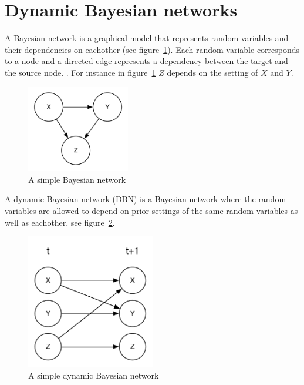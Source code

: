 \section{Dynamic Bayesian networks}
\label{sec:dbn}

A Bayesian network is a graphical model that represents random variables and
their dependencies on eachother (see figure~\ref{fig:bn}). Each random variable
corresponds to a node and a directed edge represents a dependency between the
target and the source node. \parencite{heckerman1998tutorial}. For instance in
figure~\ref{fig:bn} $Z$ depends on the setting of $X$ and $Y$. 

\begin{figure}[H]
\centering
\includegraphics[width=0.4\textwidth]{images/BN.pdf}
\caption{A simple Bayesian network}
\label{fig:bn}
\end{figure}

A dynamic Bayesian network (DBN) is a Bayesian network where the random
variables are allowed to depend on prior settings of the same random variables
as well as eachother, see figure~\ref{fig:dbn}.

\begin{figure}[H]
    \centering
    \includegraphics[width=0.5\textwidth]{images/DBN.pdf}
    \caption{A simple dynamic Bayesian network}
    \label{fig:dbn}
\end{figure}

